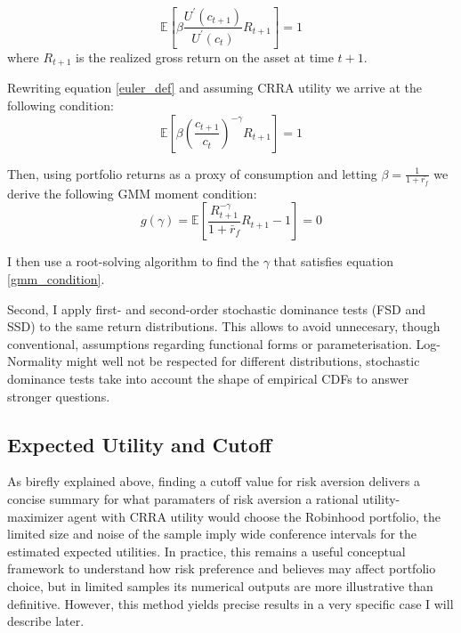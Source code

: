 \begin{equation}
    \mathbb{E}\left[ \beta \frac{U^\prime(c_{t+1})}{U^\prime(c_{t})}R_{t+1} \right] = 1
    \label{euler_def}
\end{equation}  
where $R_{t+1}$ is the realized gross return on the asset at time $t+1$.

Rewriting equation \ref{euler_def} and assuming CRRA utility we arrive at the following condition:
\begin{equation}
    \mathbb{E}\left[ \beta \left( \frac{c_{t+1}}{c_{t}} \right)^{-\gamma} R_{t+1} \right] = 1
\end{equation}  

Then, using portfolio returns as a proxy of consumption and letting $\beta = \frac{1}{1+\bar{r_f}}$ we derive the following GMM moment condition:
\begin{equation}
    g(\gamma) = \mathbb{E} \left[ \frac{R_{t+1}^{-\gamma}}{1+\bar{r}_f}  R_{t+1} - 1\right] = 0
    \label{gmm_condition}
\end{equation}  

I then use a root-solving algorithm to find the $\gamma$ that satisfies equation \ref{gmm_condition}. 



Second, I apply first- and second-order stochastic dominance tests (FSD and SSD) to the same return distributions.
This allows to avoid unnecesary, though conventional, assumptions regarding functional forms or parameterisation.
Log-Normality might well not be respected for different distributions, stochastic dominance tests take into account the shape of empirical CDFs to answer stronger questions. 

\subsection{Expected Utility and Cutoff}
As birefly explained above, finding a cutoff value for risk aversion delivers a concise summary for what paramaters of risk aversion a rational utility-maximizer agent with CRRA utility would choose the Robinhood portfolio,
the limited size and noise of the sample imply wide conference intervals for the estimated expected utilities.
In practice, this remains a useful conceptual framework to understand how risk preference and believes may affect portfolio choice, but in limited samples its numerical outputs are more illustrative than definitive.
However, this method yields precise results in a very specific case I will describe later. 

